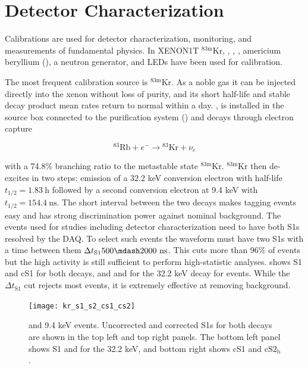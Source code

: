 \section{Detector Characterization}
\label{sec:det_char}
Calibrations are used for detector characterization, monitoring, and measurements of fundamental physics.  In XENON1T
$\mathrm{^{83m}Kr}$, , , , americium beryllium (), a neutron generator, and LEDs
have been used for calibration.

The most frequent calibration source is $\mathrm{^{83m}Kr}$.  As a noble gas it can be injected directly into the xenon without loss of
purity, and its short half-life and stable decay product mean rates return to normal within a day.  , is installed in the
source box connected to the purification system () and decays through electron capture

\begin{equation}
\mathrm{^{83}Rb} + e^- \rightarrow \mathrm{^{83}Kr} + \nu_e
\end{equation}

\noindent with a 74.8\% branching ratio to the metastable state $\mathrm{^{83m}Kr}$.  $\mathrm{^{83m}Kr}$ then de-excites in two steps:
emission of a 32.2 keV
conversion electron with half-life $t_{1/2} = 1.83\ \mathrm{h}$ followed by a second conversion electron at 9.4 keV with
$t_{1/2} = 154.4\ \mathrm{ns}$.  The short interval between the two decays makes tagging events easy and has strong discrimination power
against nominal background.  The events used for studies including detector characterization need to have both S1s resolved
by the DAQ.  To select such events the waveform must have two S1s with a time between them
$\Delta t_{\mathrm{S1}} 500 \mdash 2000\ \mathrm{ns}$.  This
cuts more than 96\% of \metakr events but the high activity is still sufficient to perform high-statistic
analyses.   shows S1 and cS1 for both decays, and \stwob and \cstwob for the 32.2 keV decay for \metakr
events.  While the
$\Delta t_{\mathrm{S1}}$ cut rejects most \metakr events, it is extremely effective at removing background.

\begin{figure}
\centering
\texttt{[image: kr\_s1\_s2\_cs1\_cs2]}
\caption{ and 9.4 keV events.  Uncorrected and corrected S1s for both decays are shown in the top left and top right
panels.  The bottom left panel shows S1 and \stwob for the 32.2 keV, and bottom right shows cS1 and $\mathrm{cS2_b}$.}
\label{fig:calibrations_kr_s1_s2}
\end{figure}

